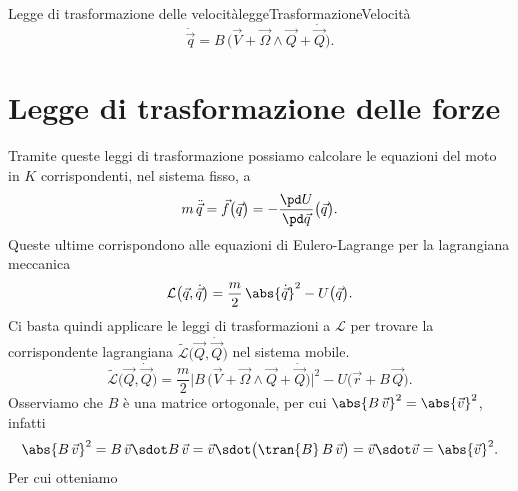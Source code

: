 \begin{remark}{Legge di trasformazione delle velocità}{leggeTrasformazioneVelocità}
	\[
		\dot{\vec{q}} = B\,\big(\vec{V} + \vec{\Omega}\wedge\vec{Q} + \dot{\vec{Q}}\big).
	\]
\end{remark}

\section{Legge di trasformazione delle forze}

Tramite queste leggi di trasformazione possiamo calcolare le equazioni del moto in \(K\) corrispondenti, nel sistema fisso, a
\[
	m\,\ddot{\vec{q}} = \vec{f}\big(\vec{q}\big) = - \frac{\pd U}{\pd\vec{q}}\big(\vec{q}\big).
\]
Queste ultime corrispondono alle equazioni di Eulero-Lagrange per la lagrangiana meccanica
\[
	\mathcal{L}\big(\vec{q},\dot{\vec{q}}\big) = \frac{m}{2}\,\abs{\dot{\vec{q}}}^2 -U\big(\vec{q}\big).
\]
Ci basta quindi applicare le leggi di trasformazioni a \(\mathcal{L}\) per trovare la corrispondente lagrangiana \(\tilde{\mathcal{L}}\big(\vec{Q},\dot{\vec{Q}}\big)\) nel sistema mobile.
\[
	\tilde{\mathcal{L}}\big(\vec{Q},\dot{\vec{Q}}\big) = \frac{m}{2}\big\lvert B\,\big(\vec{V}+\vec{\Omega}\wedge\vec{Q} + \dot{\vec{Q}}\big)\big\rvert^2 - U\big(\vec{r}+B\,\vec{Q}\big).
\]
Osserviamo che \(B\) è una matrice ortogonale, per cui \(\abs{B\,\vec{v}}^2=\abs{\vec{v}}^2\), infatti
\[
	\abs{B\,\vec{v}}^2 = B\,\vec{v} \sdot B\,\vec{v} = \vec{v}\sdot \big(\tran{B}\,B\,\vec{v}\big) = \vec{v}\sdot\vec{v} = \abs{\vec{v}}^2.
\]
Per cui otteniamo

